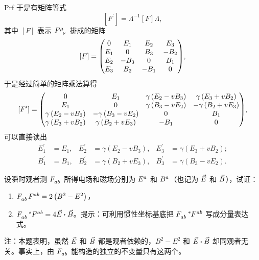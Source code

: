 \begin{xiti}
\begin{zm}
\begin{yl}{Prf}
			于是有矩阵等式
			\begin{equation*}
				\left[F^\prime\right] = \Lambda^{-1} \left[F\right] \Lambda,
			\end{equation*}
			其中 $\left[F\right]$ 表示 $\tensor{F}{^\mu_\nu}$ 排成的矩阵
			\begin{equation*}
				\left[F\right] = \mqty( 0 & E_1 & E_2 & E_3 \\ E_1 & 0 & B_3 & -B_2 \\ E_2 & -B_3 & 0 & B_1 \\ E_3 & B_2 & -B_1 & 0 ),
			\end{equation*}
			于是经过简单的矩阵乘法算得
			\begin{equation*}
				\left[ F^\prime \right] = \mqty( 0 & E_1 & \gamma \left( E_2 - v B_3 \right) & \gamma \left( E_3 + v B_2 \right) \\ E_1 & 0 & \gamma \left( B_3 - v E_2 \right) & - \gamma \left( B_2 + v E_3 \right) \\ \gamma \left( E_2 - v B_3 \right) & - \gamma \left( B_3 - v E_2 \right) & 0 & B_1 \\ \gamma \left( E_3 + v B_2 \right) & \gamma \left( B_2 + v E_3 \right) & -B_1 & 0 ),
			\end{equation*}
			可以直接读出
			\begin{align*}
				E_1^\prime &= E_1, & E_2^\prime &= \gamma \left( E_2 - v B_3 \right), & E_3^\prime &= \gamma \left( E_3 + v B_2 \right);\\
				B_1^\prime &= B_1, & B_2^\prime &= \gamma \left( B_2 + v E_3 \right), & B_3^\prime &= \gamma \left( B_3 - v E_2 \right).
			\end{align*}
		\end{yl}
	\end{zm}

	\item 设瞬时观者测 $\tensor{F}{_a_b}$ 所得电场和磁场分别为 $\tensor{E}{^a}$ 和 $\tensor{B}{^a}$（也记为 $\vec{E}$ 和 $\vec{B}$），试证：
	\begin{enumerate}[label=(\alph*)]
		\item $\tensor{F}{_a_b} \tensor{F}{^a^b} = 2 \left( B^2 - E^2 \right)$，
		\item $\tensor{F}{_a_b} \tensor[^*]{F}{^a^b} = 4 \myvec{E} \vdot \myvec{B}$。提示：可利用惯性坐标基底把 $\tensor{F}{_a_b} \tensor[^*]{F}{^a^b}$ 写成分量表达式。
	\end{enumerate}
	注：本题表明，虽然 $\vec{E}$ 和 $\vec{B}$ 都是观者依赖的，$B^2-E^2$ 和 $\myvec{E} \vdot \myvec{B}$ 却同观者无关。事实上，由 $\tensor{F}{_a_b}$ 能构造的独立的不变量只有这两个。


\end{xiti}
